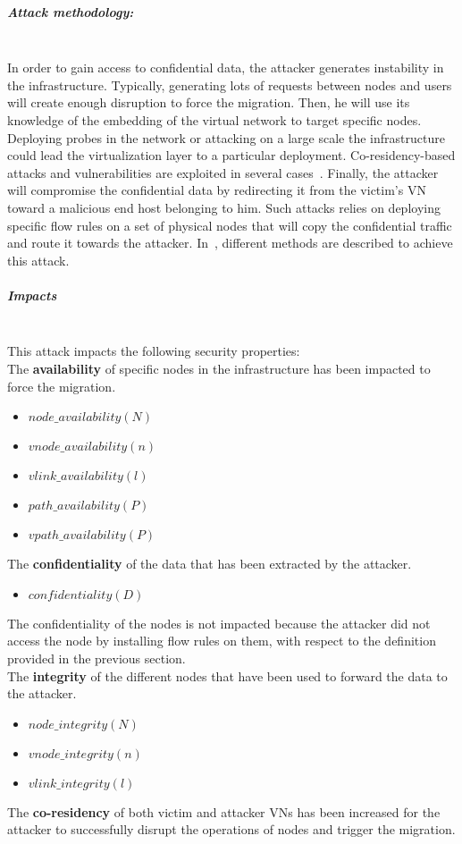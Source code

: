 \subparagraph{Attack methodology:}\textbf{\\}
In order to gain access to confidential data, the attacker generates instability in the infrastructure. Typically, generating lots of requests between nodes and users will create enough disruption to force the migration.
Then, he will use its knowledge of the embedding of the virtual network to target specific nodes.
Deploying probes in the network or attacking on a large scale the infrastructure could lead the virtualization layer to a particular deployment. Co-residency-based attacks and vulnerabilities are exploited in several cases~\cite{malicious-atya2017,nomad-Moon2015b,getoffmucloud-Ristenpart2009,stalling-atya2017}.
Finally, the attacker will compromise the confidential data by redirecting it from the victim's VN toward a malicious end host belonging to him.
Such attacks relies on deploying specific flow rules on a set of physical nodes that will copy the confidential traffic and route it towards the attacker.
In~\cite{Costa2015,Sphinx-Dhawan2015}, different methods are described to achieve this attack. 

\subparagraph{Impacts}\textbf{\\}
This attack impacts the following security properties:\\
The \textbf{availability} of specific nodes in the infrastructure has been impacted to force the migration.
\begin{itemize}
    \item $node\_availability(N)$
    \item $vnode\_availability(n)$
    \item $vlink\_availability(l)$
    \item $path\_availability(P)$
    \item $vpath\_availability(P)$
\end{itemize}
The \textbf{confidentiality} of the data that has been extracted by the attacker.
\begin{itemize}
    \item $confidentiality(D)$
\end{itemize}
The confidentiality of the nodes is not impacted because the attacker did not access the node by installing flow rules on them, with respect to the definition provided in the previous section.\\
The \textbf{integrity} of the different nodes that have been used to forward the data to the attacker.
    \begin{itemize}
    \item $node\_integrity(N)$
    \item $vnode\_integrity(n)$
    \item $vlink\_integrity(l)$
\end{itemize}
The \textbf{co-residency} of both victim and attacker VNs has been increased for the attacker to successfully disrupt the operations of nodes and trigger the migration.


